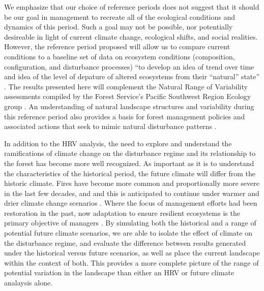 We emphasize that our choice of reference periods does not suggest that it should be our goal in management to recreate all of the ecological conditions and dynamics of this period. Such a goal may not be possible, nor potentially desireable in light of current climate change, ecological shifts, and social realities. However, the reference period proposed will allow us to compare current conditions to a baseline set of data on ecosystem conditions (composition, configuration, and disturbance processes) ``to develop an idea of trend over time and idea of the level of depature of altered ecosystems from their ``natural'' state'' \citep{Safford2013}. The results presented here will complement the Natural Range of Variability assessments compiled by the Forest Service's Pacific Southwest Region Ecology group \citep[e.g.,][]{Safford2013,Merriam2013,Meyer2013a,Meyer2013,Estes2013,Estes2013a,Gross2013}. An understanding of natural landscape structures and variability during this reference period also provides a basis for forest management policies and associated actions that seek to mimic natural disturbance patterns \citep{Romme2000,Buse2002}. 



In addition to the HRV analysis, the need to explore and understand the ramifications of climate change on the disturbance regime and its relationship to the forest has become more well recognized. As important as it is to understand the characteristics of the historical period, the future climate will differ from the historic climate. Fires have become more common and proportionally more severe in the last few decades, and and this is anticipated to continue under warmer and drier climate change scenarios \citep{McKenzie2004,Westerling2008,Miller2012}. Where the focus of management efforts had been restoration in the past, now adaptation to ensure resilient ecosystems is the primary objective of managers \citep{Stephens2010}. By simulating both the historical and a range of potential future climate scenarios, we are able to isolate the effect of climate on the disturbance regime, and evaluate the difference between results generated under the historical versus future scenarios, as well as place the current landscape within the context of both. This provides a more complete picture of the range of potential variation in the landscape than either an HRV or future climate analaysis alone.



